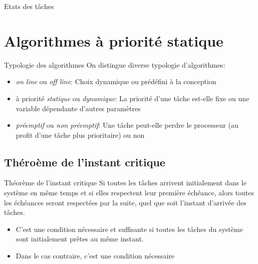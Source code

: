 \begin{frame}{Etats des tâches}
  \begin{center}
    
  \end{center}
\end{frame} 


\section{Algorithmes à priorité statique}

\begin{frame}{Typologie des algorithmes}
  On distingue diverse typologie d'algorithmes:
  \begin{itemize}
  \item  \emph{on  line}  ou   \emph{off  line}:  Choix  dynamique  ou
    prédéfini à la conception
  \item  à priorité \emph{statique}  ou \emph{dynamique}:  La priorité
    d'une  tâche est-elle  fixe  ou une  variable dépendante  d'autres
    paramètres 
  \item \emph{préemptif} ou  \emph{non préemptif}: Une tâche peut-elle
    perdre le  processeur (au profit d'une tâche  plus prioritaire) ou
    non
  \end{itemize}
\end{frame}

\subsection{Théroème de l'instant critique}

\begin{frame}{Théorème de l'instant critique}
  Si toutes les  tâches arrivent initialement dans le  système en même
  temps et  si elles respectent  leur première échéance,  alors toutes
  les  échéances  seront  respectées  par  la  suite,  quel  que  soit
  l'instant d'arrivée des tâches.

  \begin{itemize}
  \item  C'est une condition  nécessaire et  suffisante si  toutes les
    tâches du système sont initialement prêtes au même instant.
  \item Dans le cas contraire, c'est une condition nécessaire
  \end{itemize}

\end{frame}

